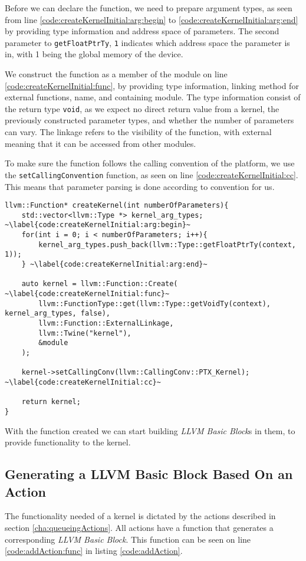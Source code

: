 Before we can declare the function, we need to prepare argument types, as seen from line \ref{code:createKernelInitial:arg:begin} to \ref{code:createKernelInitial:arg:end} by providing type information and address space of parameters. The second parameter to \texttt{getFloatPtrTy}, \texttt{1} indicates which address space the parameter is in, with 1 being the global memory of the device.

We construct the function as a member of the module on line \ref{code:createKernelInitial:func}, by providing type information, linking method for external functions, name, and containing module. The type information consist of the return type \texttt{void}, as we expect no direct return value from a kernel, the previously constructed parameter types, and whether the number of parameters can vary. The linkage refers to the visibility of the function, with external meaning that it can be accessed from other modules.

To make sure the function follows the calling convention of the platform, we use the \texttt{setCallingConvention} function, as seen on line \ref{code:createKernelInitial:cc}. This means that parameter parsing is done according to convention for us.

\begin{lstlisting}[caption={The createKernel function}, label={code:createKernelInitial}]
llvm::Function* createKernel(int numberOfParameters){
    std::vector<llvm::Type *> kernel_arg_types; ~\label{code:createKernelInitial:arg:begin}~
    for(int i = 0; i < numberOfParameters; i++){
        kernel_arg_types.push_back(llvm::Type::getFloatPtrTy(context, 1));
    } ~\label{code:createKernelInitial:arg:end}~

    auto kernel = llvm::Function::Create( ~\label{code:createKernelInitial:func}~
        llvm::FunctionType::get(llvm::Type::getVoidTy(context), kernel_arg_types, false),
        llvm::Function::ExternalLinkage,
        llvm::Twine("kernel"),
        &module
    );

    kernel->setCallingConv(llvm::CallingConv::PTX_Kernel); ~\label{code:createKernelInitial:cc}~

    return kernel;
}
\end{lstlisting}

With the function created we can start building \textit{LLVM Basic Block}s in them, to provide functionality to the kernel.

\subsection{Generating a LLVM Basic Block Based On an Action} \label{sec:bbbuilding}
The functionality needed of a kernel is dictated by the actions described in section \ref{cha:queueingActions}. All actions have a function that generates a corresponding \textit{LLVM Basic Block}. This function can be seen on line \ref{code:addAction:func} in listing \ref{code:addAction}.

